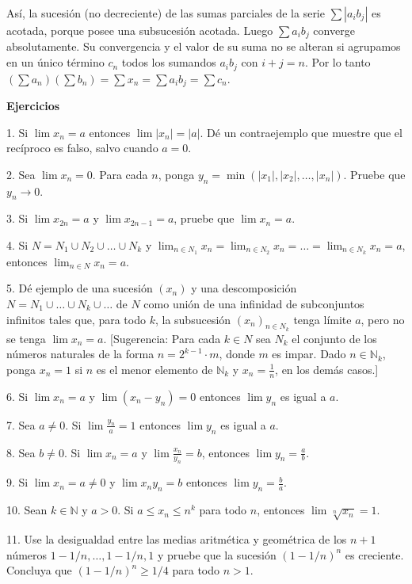 \documentclass[12pt,oneside]{book}
\begin{document}
Así, la sucesión (no decreciente) de las sumas parciales de la serie \(\sum |a_i b_j|\) es acotada, porque posee una subsucesión acotada. Luego \(\sum a_i b_j\) converge absolutamente. Su convergencia y el valor de su suma no se alteran si agrupamos en un único término \(c_n\) todos los sumandos \(a_i b_j\) con \(i+j = n\). Por lo tanto \((\sum a_n)(\sum b_n) = \sum x_n = \sum a_i b_j = \sum c_n\).

\textbf{Ejercicios}

1. Si \(\lim x_n = a\) entonces \(\lim |x_n| = |a|\). Dé un contraejemplo que muestre que el recíproco es falso, salvo cuando \(a = 0\).

2. Sea \(\lim x_n = 0\). Para cada \(n\), ponga \(y_n = \min(|x_1|, |x_2|, \dots, |x_n|)\). Pruebe que \(y_n \to 0\).

3. Si \(\lim x_{2n} = a\) y \(\lim x_{2n-1} = a\), pruebe que \(\lim x_n = a\).

4. Si \(N = N_1 \cup N_2 \cup \dots \cup N_k\) y \(\lim_{n \in N_1} x_n = \lim_{n \in N_2} x_n = \dots = \lim_{n \in N_k} x_n = a\), entonces \(\lim_{n \in N} x_n = a\).

5. Dé ejemplo de una sucesión \((x_n)\) y una descomposición \(N = N_1 \cup \dots \cup N_k \cup \dots\) de \(N\) como unión de una infinidad de subconjuntos infinitos tales que, para todo \(k\), la subsucesión \((x_n)_{n \in N_k}\) tenga límite \(a\), pero no se tenga \(\lim x_n = a\). [Sugerencia: Para cada \(k \in N\) sea \(N_k\) el conjunto de los números naturales de la forma \( n = 2^{k-1} \cdot m \), donde \( m \) es impar. Dado \( n \in \mathbb{N}_k \), ponga \( x_n = 1 \) si \( n \) es el menor elemento de \( \mathbb{N}_k \) y \( x_n = \frac{1}{n} \), en los demás casos.]

6. Si \( \lim x_n = a \) y \( \lim (x_n - y_n) = 0 \) entonces \( \lim y_n \) es igual a \( a \).

7. Sea \( a \neq 0 \). Si \( \lim \frac{y_n}{a} = 1 \) entonces \( \lim y_n \) es igual a \( a \).

8. Sea \( b \neq 0 \). Si \( \lim x_n = a \) y \( \lim \frac{x_n}{y_n} = b \), entonces \( \lim y_n = \frac{a}{b} \).

9. Si \( \lim x_n = a \neq 0 \) y \( \lim x_n y_n = b \) entonces \( \lim y_n = \frac{b}{a} \).

10. Sean \( k \in \mathbb{N} \) y \( a > 0 \). Si \( a \leq x_n \leq n^k \) para todo \( n \), entonces \( \lim \sqrt[n]{x_n} = 1 \).

11. Use la desigualdad entre las medias aritmética y geométrica de los \( n + 1 \) números \( 1 - 1/n, \ldots, 1 - 1/n, 1 \) y pruebe que la sucesión \( (1 - 1/n)^n \) es creciente. Concluya que \( (1 - 1/n)^n \geq 1/4 \) para todo \( n > 1 \).
\end{document}
